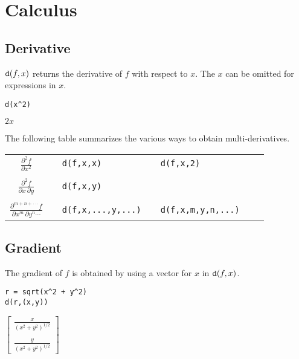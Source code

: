 \section{Calculus}

\subsection{Derivative}

$\text{\tt d}(f,x)$ returns the derivative of $f$ with respect to $x$.
The $x$ can be omitted for expressions in $x$.

{\color{blue}
\begin{verbatim}
d(x^2)
\end{verbatim}
}

\noindent
$2x$

\bigskip
\noindent
The following table summarizes the various ways to obtain multi-derivatives.

\begin{center}
\begin{tabular}{cllllll}
$\displaystyle{\frac{\partial^2f}{\partial x^2}}$ & & \verb$d(f,x,x)$ & & \verb$d(f,x,2)$ \\
\\
$\displaystyle{\frac{\partial^2f}{\partial x\,\partial y}}$ & & \verb$d(f,x,y)$ \\
\\
$\displaystyle{\frac{\partial^{m+n+\cdot\cdot\cdot} f}{\partial x^m\,\partial y^n\cdots}}$ & &
\verb$d(f,x,...,y,...)$ & & \verb$d(f,x,m,y,n,...)$ \\
\end{tabular}
\end{center}

\subsection{Gradient}

The gradient of $f$ is obtained by using a vector for $x$ in $\text{\tt d}(f,x)$.

{\color{blue}
\begin{verbatim}
r = sqrt(x^2 + y^2)
d(r,(x,y))
\end{verbatim}
}

\noindent
$\displaystyle
\begin{bmatrix}
{\displaystyle \frac{x}{(x^2+y^2)^{1/2}}}
\\
\\
{\displaystyle \frac{y}{(x^2+y^2)^{1/2}}}
\end{bmatrix}
$


